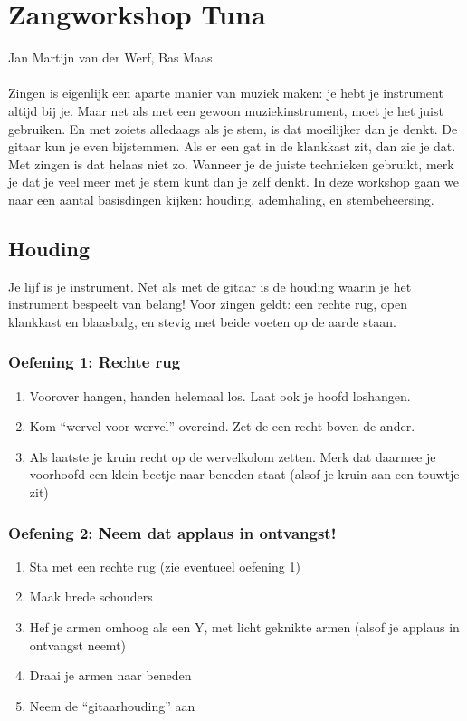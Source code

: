 \section{Zangworkshop Tuna}
Jan Martijn van der Werf, Bas Maas\\
\\
Zingen is eigenlijk een aparte manier van muziek maken: je hebt je instrument altijd bij je. Maar net als met een gewoon muziekinstrument, moet je het juist gebruiken. En met zoiets alledaags als je stem, is dat moeilijker dan je denkt. De gitaar kun je even bijstemmen. Als er een gat in de klankkast zit, dan zie je dat. Met zingen is dat helaas niet zo. Wanneer je de juiste technieken gebruikt, merk je dat je veel meer met je stem kunt dan je zelf denkt. In deze workshop gaan we naar een aantal basisdingen kijken: houding, ademhaling, en stembeheersing.
\subsection*{Houding}
Je lijf is je instrument. Net als met de gitaar is de houding waarin je het instrument bespeelt van belang! Voor zingen geldt: een rechte rug, open klankkast en blaasbalg, en stevig met beide voeten op de aarde staan.
\subsubsection*{Oefening 1: Rechte rug}
\begin{enumerate}
\item Voorover hangen, handen helemaal los. Laat ook je hoofd loshangen. 
\item Kom “wervel voor wervel” overeind. Zet de een recht boven de ander. 
\item Als laatste je kruin recht op de wervelkolom zetten. Merk dat daarmee je voorhoofd een klein beetje naar beneden staat (alsof je kruin aan een touwtje zit)
\end{enumerate}
\subsubsection*{Oefening 2: Neem dat applaus in ontvangst!}
\begin{enumerate}
\item Sta met een rechte rug (zie eventueel oefening 1) 
\item Maak brede schouders
\item Hef je armen omhoog als een Y, met licht geknikte armen (alsof je applaus in ontvangst neemt)
\item Draai je armen naar beneden
\item Neem de “gitaarhouding” aan
\end{enumerate}
